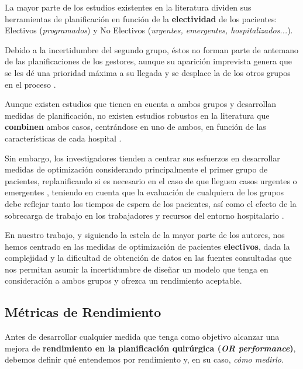 La mayor parte de los estudios existentes en la literatura dividen sus herramientas de planificación en función de la \textbf{electividad} de los pacientes: Electivos (\textit{programados}) y No Electivos (\textit{urgentes, emergentes, hospitalizados...}).

Debido a la incertidumbre del segundo grupo, éstos no forman parte de antemano de las planificaciones de los gestores, aunque su aparición imprevista genera que se les dé una prioridad máxima a su llegada y se desplace la de los otros grupos en el proceso \cite{CAYIRLI2009OUTPATIENTLITERATURE} .

Aunque existen estudios que tienen en cuenta a ambos grupos y desarrollan medidas de planificación, no existen estudios robustos en la literatura que \textbf{combinen} ambos casos, centrándose en uno de ambos, en función de las características de cada hospital \cite{Gur2018ApplicationOverview}.

Sin embargo, los investigadores tienden a centrar sus esfuerzos en desarrollar medidas de optimización considerando principalmente el primer grupo de pacientes, replanificando si es necesario en el caso de que lleguen casos urgentes o emergentes \cite{Nouaouri2011OperatingDisaster}, teniendo en cuenta que la evaluación de cualquiera de los grupos debe reflejar tanto los tiempos de espera de los pacientes, así como el efecto de la sobrecarga de trabajo en los trabajadores y recursos del entorno hospitalario \cite{Gur2018ApplicationOverview}.

En nuestro trabajo, y siguiendo la estela de la mayor parte de los autores, nos hemos centrado en las medidas de optimización de pacientes \textbf{electivos}, dada la complejidad y la dificultad de obtención de datos en las fuentes consultadas que nos permitan asumir la incertidumbre de diseñar un modelo que tenga en consideración a ambos grupos y ofrezca un rendimiento aceptable.

\subsection{Métricas de Rendimiento}

Antes de desarrollar cualquier medida que tenga como objetivo alcanzar una mejora de \textbf{rendimiento en la planificación quirúrgica (\textit{OR performance})}, debemos definir qué entendemos por rendimiento y, en su caso, \textit{cómo medirlo}. 

